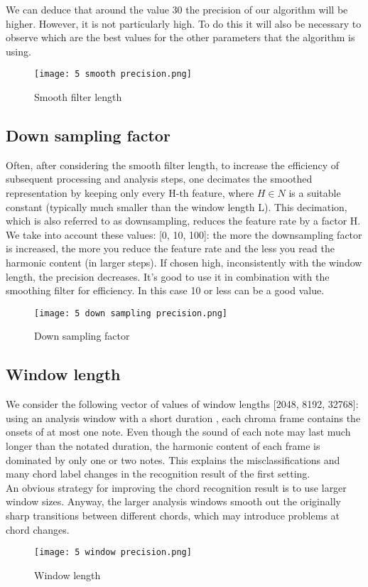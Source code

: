 \documentclass{article}
\begin{document}
We can deduce that around the value 30 the precision of our algorithm will be higher. However, it is not particularly high. To do this it will also be necessary to observe which are the best values for the other parameters that the algorithm is using. \\


\begin{figure} [H]
 \centering
 \texttt{[image: 5 smooth precision.png]}
 \caption{Smooth filter length}
\end{figure}

\subsection{Down sampling factor}
Often, after considering the smooth filter length, to increase the efficiency of subsequent processing and analysis steps, one decimates the smoothed representation by keeping only every H-th feature, where  \(H \in N\) is a suitable constant (typically much smaller than the window length L). This decimation, which is also referred to as downsampling, reduces the feature rate by a factor H.\\

We take into account these values: [0, 10, 100]: the more the downsampling factor is increased, the more you reduce the feature rate and the less you read the harmonic content (in larger steps). If chosen high, inconsistently with the window length, the precision decreases.
It's good to use it in combination with the smoothing filter for efficiency. In this case 10 or less can be a good value. 

\begin{figure} [H]
 \centering
 \texttt{[image: 5 down sampling precision.png]}
 \caption{Down sampling factor}
\end{figure}



\subsection{Window length}
We consider the following vector of values of window lengths [2048, 8192, 32768]:  using an analysis window with a short duration , each chroma frame contains the onsets of at most one note. Even though the sound of each note may last much longer than the notated duration, the harmonic content of each frame is dominated by only one or two notes. This explains the misclassifications and many chord label changes in the recognition result of the first setting. \\
An obvious strategy for improving the chord recognition result is to use larger window sizes. Anyway, the larger analysis windows smooth out the originally sharp transitions between different chords, which may introduce problems at chord changes.\\

\begin{figure} [H]
 \centering
 \texttt{[image: 5 window precision.png]}
 \caption{Window length}
\end{figure}
\end{document}
